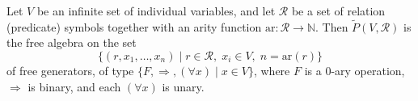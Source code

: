 Let $V$ be an infinite set of individual variables, and let $\mathcal{R}$ be a set of relation (predicate) symbols together with an arity function $\text{ar} : \mathcal{R} \rightarrow \mathbb{N}$. Then $\tilde{P}(V, \mathcal{R})$ is the free algebra on the set
$$\{(r, x_1, \ldots, x_n) \mid r \in \mathcal{R},\; x_i \in V,\; n = \text{ar}(r)\}$$
of free generators, of type $\{F, \Rightarrow, (\forall x) \mid x \in V\}$, where $F$ is a $0$-ary operation, $\Rightarrow$ is binary, and each $(\forall x)$ is unary.